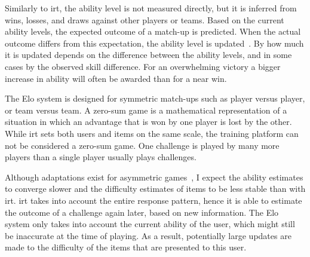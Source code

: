 Similarly to \gls{irt}, the ability level is not measured directly, but it is inferred from wins, losses, and draws against other players or teams.
Based on the current ability levels, the expected outcome of a match-up is predicted.
When the actual outcome differs from this expectation, the ability level is updated~\cite{elo2008logistic}.
By how much it is updated depends on the difference between the ability levels, and in some cases by the observed skill difference.
For an overwhelming victory a bigger increase in ability will often be awarded than for a near win.

The Elo system is designed for symmetric match-ups such as player versus player, or team versus team.
A zero-sum game is a mathematical representation of a situation in which an advantage that is won by one player is lost by the other.
While \gls{irt} sets both users and items on the same scale, the training platform can not be considered a zero-sum game.
One challenge is played by many more players than a single player usually plays challenges.

Although adaptations exist for asymmetric games~\cite{wise2021elo}, I expect the ability estimates to converge slower and the difficulty estimates of items to be less stable than with \gls{irt}.
\Gls{irt} takes into account the entire response pattern, hence it is able to estimate the outcome of a challenge again later, based on new information.
The Elo system only takes into account the current ability of the user, which might still be inaccurate at the time of playing.
As a result, potentially large updates are made to the difficulty of the items that are presented to this user.